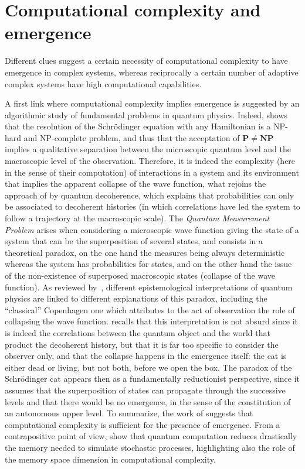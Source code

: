 \section{Computational complexity and emergence}

Different clues suggest a certain necessity of computational complexity to have emergence in complex systems, whereas reciprocally a certain number of adaptive complex systems have high computational capabilities.


A first link where computational complexity implies emergence is suggested by an algorithmic study of fundamental problems in quantum physics. Indeed, \cite{2014arXiv1403.7686B} shows that the resolution of the Schrödinger equation with any Hamiltonian is a NP-hard and NP-complete problem, and thus that the acceptation of $\mathbf{P}\neq\mathbf{NP}$ implies a qualitative separation between the microscopic quantum level and the macroscopic level of the observation. Therefore, it is indeed the complexity (here in the sense of their computation) of interactions in a system and its environment that implies the apparent collapse of the wave function, what rejoins the approach of \cite{gell1996quantum} by quantum decoherence, which explains that probabilities can only be associated to decoherent histories (in which correlations have led the system to follow a trajectory at the macroscopic scale). The \emph{Quantum Measurement Problem} arises when considering a microscopic wave function giving the state of a system that can be the superposition of several states, and consists in a theoretical paradox, on the one hand the measures being always deterministic whereas the system has probabilities for states, and on the other hand the issue of the non-existence of superposed macroscopic states (collapse of the wave function). As reviewed by~\cite{schlosshauer2005decoherence}, different epistemological interpretations of quantum physics are linked to different explanations of this paradox, including the ``classical'' Copenhagen one which attributes to the act of observation the role of collapsing the wave function. \cite{gell1996quantum} recalls that this interpretation is not absurd since it is indeed the correlations between the quantum object and the world that product the decoherent history, but that it is far too specific to consider the observer only, and that the collapse happens in the emergence itself: the cat is either dead or living, but not both, before we open the box. The paradox of the Schrödinger cat appears then as a fundamentally reductionist perspective, since it assumes that the superposition of states can propagate through the successive levels and that there would be no emergence, in the sense of the constitution of an autonomous upper level. To summarize, the work of \cite{2014arXiv1403.7686B} suggests that computational complexity is sufficient for the presence of emergence. From a contrapositive point of view, \cite{2017arXiv170404231E} show that quantum computation reduces drastically the memory needed to simulate stochastic processes, highlighting also the role of the memory space dimension in computational complexity.


